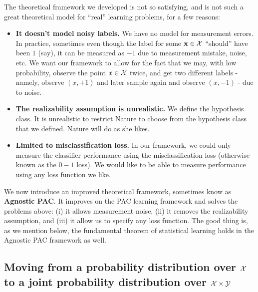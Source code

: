   The theoretical framework we developed is not so satisfying, and is
  not such a great theoretical model for ``real'' learning problems, for a few
  reasons:
  \begin{itemize}
    \item {\bf It doesn't model noisy labels.} We have no model for measurement errors. In practice, sometimes even
      though the label for some ${\mathbf x}\in\mathcal{X}$ ``should'' have been $1$ (say), it can
      be measured as $-1$ due to measurement mistake, noise, etc. We want our
      framework to allow for the fact that we may, with low probability, observe the point $x\in\mathcal{X}$
      twice, and get two different labels - namely, observe $(x,+1)$ and later
	sample again and observe $(x,-1)$ - due to noise. 
      \item {\bf The realizability assumption is  unrealistic.} We define
        the hypothesis class.  It is unrealistic to restrict Nature to choose
	from the hypothesis class that we defined. Nature will do as she likes.
      \item {\bf Limited to misclassification loss.} In our framework, we could
	only
	measure the classifier performance using the misclassification loss
	(otherwise known as the $0-1$ loss). We would like to be able to measure
	performance using any loss function we like.
  \end{itemize}

  We now introduce an improved theoretical framework, sometimes know as {\bf
  Agnostic PAC}. It improves on the PAC learning framework and  solves the
  problems above: (i) it allows 
  measurement noise,  (ii) it removes the realizability assumption, and (iii) it
  allow us to specify any loss function. The good
  thing is, as we mention below, the fundamental theorem of statistical learning
  holds in the Agnostic PAC framework as well.


  \subsection{Moving from a probability distribution over $\mathcal{X}$ to a joint
  probability distribution over $\mathcal{X}\times\mathcal{Y}$}

